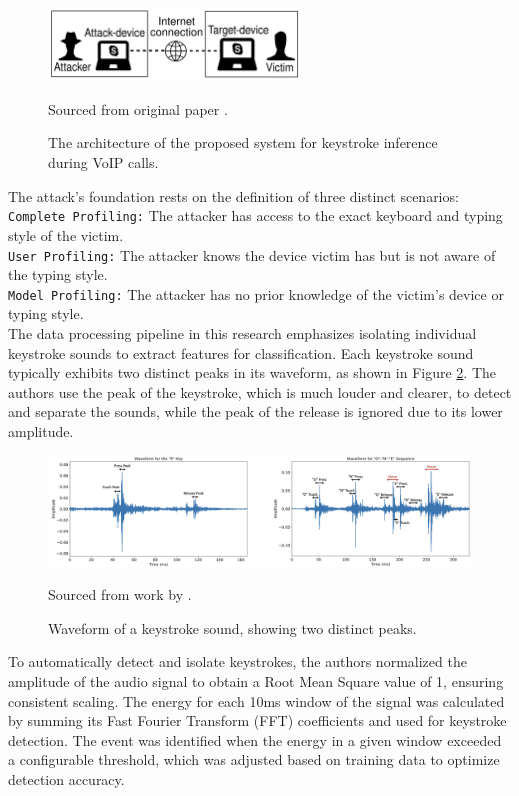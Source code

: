 \documentclass[a4paper,11pt,twoside]{report}
\theoremstyle{definition}
\begin{document}
\begin{figure}[h!]
    \centering
    \includegraphics[width=0.6\textwidth]{img_related_work/skype_arch.png}
    \caption{The architecture of the proposed system for keystroke inference during VoIP calls.}
    \footnotesize{Sourced from original paper \cite{skypetype}.}
    \label{fig:skypetype}
\end{figure}

\noindent The attack's foundation rests on the definition of three distinct scenarios: \\
\texttt{Complete Profiling:} The attacker has access to the exact keyboard and typing style of the victim. \\
\texttt{User Profiling:} The attacker knows the device victim has but is not aware of the typing style.\\
\texttt{Model Profiling:} The attacker has no prior knowledge of the victim’s device or typing style.\\

The data processing pipeline in this research emphasizes isolating individual keystroke sounds to extract features for classification. Each keystroke sound typically exhibits two distinct peaks in its waveform, as shown in Figure \ref{fig:skypewaveform}. The authors use the peak of the keystroke, which is much louder and clearer, to detect and separate the sounds, while the peak of the release is ignored due to its lower amplitude.

\begin{figure}[h!]
  \centering
  \includegraphics[width=\textwidth]{img_related_work/release_peak.png}
  \caption{Waveform of a keystroke sound, showing two distinct peaks.}
  \footnotesize{Sourced from work by \cite{rnn2019}.}
  \label{fig:skypewaveform}
\end{figure}

To automatically detect and isolate keystrokes, the authors normalized the amplitude of the audio signal to obtain a Root Mean Square value of 1, ensuring consistent scaling. The energy for each 10ms window of the signal was calculated by summing its Fast Fourier Transform (FFT) coefficients and used for keystroke detection. The event was identified when the energy in a given window exceeded a configurable threshold, which was adjusted based on training data to optimize detection accuracy.
\end{document}
